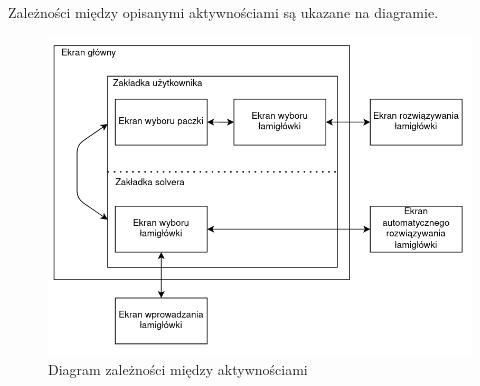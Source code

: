     Zależności między opisanymi aktywnościami są ukazane na diagramie.

\begin{figure}[!htb]
    \centering
    \includegraphics[width=\textwidth]{images/screens_diagram.png}
    \caption{Diagram zależności między aktywnościami}
    \label{diagAktywnosci}
\end{figure}
